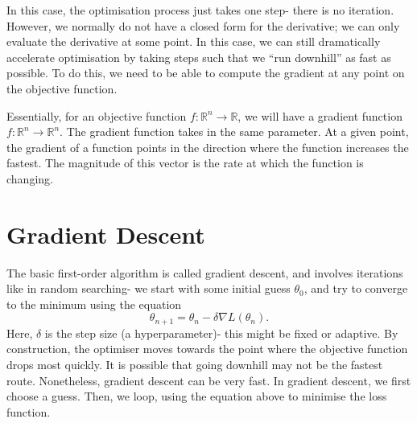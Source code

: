 \documentclass[a4paper, openany]{memoir}
\begin{document}
In this case, the optimisation process just takes one step- there is no iteration. However, we normally do not have a closed form for the derivative; we can only evaluate the derivative at some point. In this case, we can still dramatically accelerate optimisation by taking steps such that we ``run downhill'' as fast as possible. To do this, we need to be able to compute the gradient at any point on the objective function.

Essentially, for an objective function $f: \mathbb{R}^n \to \mathbb{R}$, we will have a gradient function $f: \mathbb{R}^n \to \mathbb{R}^n$. The gradient function takes in the same parameter. At a given point, the gradient of a function points in the direction where the function increases the fastest. The magnitude of this vector is the rate at which the function is changing.

\section{Gradient Descent}
The basic first-order algorithm is called gradient descent, and involves iterations like in random searching- we start with some initial guess $\theta_0$, and try to converge to the minimum using the equation
\[\theta_{n+1} = \theta_n - \delta \nabla L(\theta_n).\]
Here, $\delta$ is the step size (a hyperparameter)- this might be fixed or adaptive. By construction, the optimiser moves towards the point where the objective function drops most quickly. It is possible that going downhill may not be the fastest route. Nonetheless, gradient descent can be very fast. In gradient descent, we first choose a guess. Then, we loop, using the equation above to minimise the loss function. 
\end{document}
